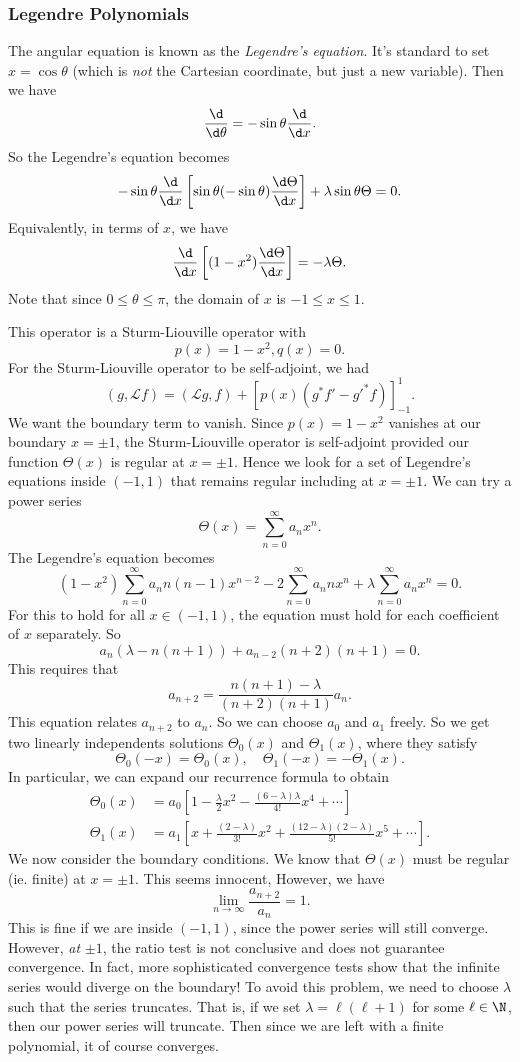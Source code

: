 \documentclass[a4paper]{article}
\begin{document}
\subsubsection{Legendre Polynomials}
The angular equation is known as the \emph{Legendre's equation}. It's standard to set $x = \cos \theta$ (which is \emph{not} the Cartesian coordinate, but just a new variable). Then we have
\[
  \frac{\d}{\d \theta} = -\sin \theta \frac{\d}{\d x}.
\]
So the Legendre's equation becomes
\[
  -\sin \theta \frac{\d}{\d x}\left[\sin \theta (-\sin \theta) \frac{\d \Theta}{\d x}\right]+ \lambda \sin \theta \Theta = 0.
\]
Equivalently, in terms of $x$, we have
\[
  \frac{\d}{\d x}\left[(1 - x^2) \frac{\d \Theta}{\d x}\right] = -\lambda \Theta.
\]
Note that since $0 \leq \theta \leq \pi$, the domain of $x$ is $-1 \leq x \leq 1$.

This operator is a Sturm-Liouville operator with
\[
  p(x) = 1 - x^2, q(x) = 0.
\]
For the Sturm-Liouville operator to be self-adjoint, we had
\[
  (g, \mathcal{L} f) = (\mathcal{L}g, f) + [p(x) (g^* f' - g'^* f)]^{1}_{-1}.
\]
We want the boundary term to vanish. Since $p(x) = 1- x^2$ vanishes at our boundary $x = \pm 1$, the Sturm-Liouville operator is self-adjoint provided our function $\Theta(x)$ is regular at $x = \pm 1$. Hence we look for a set of Legendre's equations inside $(-1, 1)$ that remains regular including at $x = \pm 1$. We can try a power series
\[
  \Theta(x) = \sum_{n = 0}^\infty a_n x^n.
\]
The Legendre's equation becomes
\[
  (1 - x^2) \sum_{n = 0}^\infty a_n n(n - 1)x^{n - 2} - 2\sum_{n = 0}^\infty a_n nx^n + \lambda \sum_{n = 0}^\infty a_n x^n = 0.
\]
For this to hold for all $x\in (-1, 1)$, the equation must hold for each coefficient of $x$ separately. So
\[
  a_n(\lambda - n(n + 1)) + a_{n - 2}(n + 2)(n + 1) = 0.
\]
This requires that
\[
  a_{n + 2} = \frac{n(n + 1) - \lambda}{(n + 2)(n + 1)} a_n.
\]
This equation relates $a_{n + 2}$ to $a_n$. So we can choose $a_0$ and $a_1$ freely. So we get two linearly independents solutions $\Theta_0(x)$ and $\Theta_1(x)$, where they satisfy
\[
  \Theta_0(-x) = \Theta_0(x), \quad \Theta_1(-x) = -\Theta_1(x).
\]
In particular, we can expand our recurrence formula to obtain
\begin{align*}
  \Theta_0(x) &= a_0 \left[1 - \frac{\lambda}{2} x^2 - \frac{(6 - \lambda)\lambda}{4!}x^4 + \cdots\right]\\
  \Theta_1(x) &= a_1 \left[x + \frac{(2 - \lambda)}{3!}x^2 + \frac{(12 - \lambda)(2 - \lambda)}{5!}x^5 + \cdots\right].
\end{align*}
We now consider the boundary conditions. We know that $\Theta(x)$ must be regular (ie. finite) at $x = \pm 1$. This seems innocent, However, we have
\[
  \lim_{n \to \infty}\frac{a_{n + 2}}{a_n} = 1.
\]
This is fine if we are inside $(-1, 1)$, since the power series will still converge. However, \emph{at} $\pm 1$, the ratio test is not conclusive and does not guarantee convergence. In fact, more sophisticated convergence tests show that the infinite series would diverge on the boundary! To avoid this problem, we need to choose $\lambda$ such that the series truncates. That is, if we set $\lambda = \ell(\ell + 1)$ for some $\ell \in \N$, then our power series will truncate. Then since we are left with a finite polynomial, it of course converges.
\end{document}
